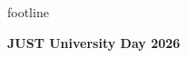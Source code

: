 \documentclass[final,hyperref={pdfpagelabels=false}]{beamer}
\newlength{\sepwid}
\newlength{\onecolwid}
\begin{document}
\begin{frame}[t]
\begin{columns}[t]
\begin{column}{\onecolwid}
\end{column}

\begin{column}{\sepwid}\end{column}

\end{columns}

\vfill
\begin{beamercolorbox}[wd=\paperwidth,ht=2cm,dp=0.5cm]{footline}
    \begin{center}
        \color{white}\Large\textbf{JUST University Day 2026}
    \end{center}
\end{beamercolorbox}

\end{frame}
\end{document}
